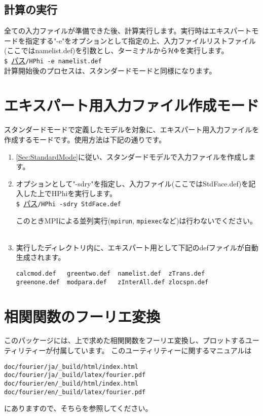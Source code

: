 \subsection{計算の実行}
全ての入力ファイルが準備できた後、計算実行します。実行時はエキスパートモードを指定する"-e"をオプションとして指定の上、入力ファイルリストファイル(ここではnamelist.def)を引数とし、ターミナルから$\mathcal{H} \Phi$を実行します。\\
\verb|$ |\underline{パス}\verb|/HPhi -e namelist.def|
~\\
計算開始後のプロセスは、スタンダードモードと同様になります。

\newpage
\section{エキスパート用入力ファイル作成モード}
スタンダードモードで定義したモデルを対象に、エキスパート用入力ファイルを作成するモードです。使用方法は下記の通りです。
\begin{enumerate}
\item{\ref{Sec:StandardMode}に従い、スタンダードモデルで入力ファイルを作成します。}
\item{オプションとして"-sdry"を指定し、入力ファイル(ここではStdFace.def)を記入した上でHPhiを実行します。}\\
\verb|$ |\underline{パス}\verb|/HPhi -sdry StdFace.def|

このときMPIによる並列実行(\verb|mpirun|, \verb|mpiexec|など)は行わないでください。
~\\
\item{実行したディレクトリ内に、エキスパート用として下記のdefファイルが自動生成されます。}\\
\begin{minipage}{12cm}
\begin{screen}
\begin{verbatim}
calcmod.def   greentwo.def  namelist.def  zTrans.def
greenone.def  modpara.def   zInterAll.def zlocspn.def
\end{verbatim}
\end{screen}
\end{minipage}
\end{enumerate}

\section{相関関数のフーリエ変換}

このパッケージには、上で求めた相関関数をフーリエ変換し、プロットするユーティリティーが付属しています。
このユーティリティーに関するマニュアルは
\begin{verbatim}
doc/fourier/ja/_build/html/index.html
doc/fourier/ja/_build/latex/fourier.pdf
doc/fourier/en/_build/html/index.html
doc/fourier/en/_build/latex/fourier.pdf
\end{verbatim}
にありますので、そちらを参照してください。
